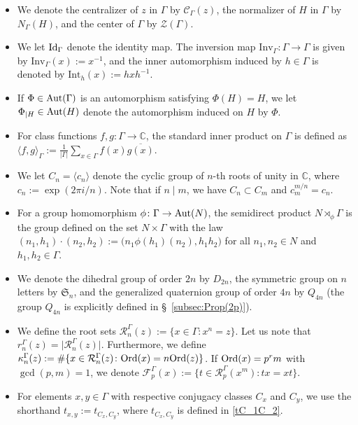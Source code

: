 \documentclass[12pt]{amsart}
\numberwithin{equation}{section}
\newcommand{\Ord}{{\rm Ord}}
\newcommand{\Id}{{\rm Id}}
\newcommand{\Aut}{{\rm Aut}}
\newcommand{\C}{\mathbb C}
\theoremstyle{definition}
\theoremstyle{remark}
\begin{document}
\begin{itemize}
    \item We denote the centralizer of $z$ in $\Gamma$ by $\mathcal{C}_\Gamma(z)$, the normalizer of $H$ in $\Gamma$ by $N_\Gamma(H)$, and the center of $\Gamma$ by $\mathcal{Z}(\Gamma)$.
    \item We let $\Id_\Gamma$ denote the identity map. The inversion map $\mathrm{Inv}_\Gamma \colon \Gamma \to \Gamma$ is given by $\mathrm{Inv}_\Gamma(x) := x^{-1}$, and the inner automorphism induced by $h \in \Gamma$ is denoted by $\mathrm{Int}_h(x) := h x h^{-1}$.
    \item If $\Phi \in \Aut(\Gamma)$ is an automorphism satisfying $\Phi(H) = H$, we let $\Phi_{|H} \in \Aut(H)$ denote the automorphism induced on $H$ by $\Phi$.
    \item For class functions $f, g \colon \Gamma \to \C$, the standard inner product on $\Gamma$ is defined as $\langle f, g \rangle_\Gamma := \frac{1}{|\Gamma|} \sum_{x \in \Gamma} f(x)\overline{g(x)}$.
    \item We let $C_n = \langle c_n \rangle$ denote the cyclic group of $n$-th roots of unity in $\C$, where $c_n := \exp(2\pi i/n)$. Note that if $n \mid m$, we have $C_n \subset C_m$ and $c_m^{m/n} = c_n$.
    \item For a group homomorphism $\phi \colon \Gamma \to \Aut(N)$, the semidirect product $N \rtimes_\phi \Gamma$ is the group defined on the set $N \times \Gamma$ with the law $(n_1, h_1) \cdot (n_2, h_2) := \bigl(n_1 \phi(h_1)(n_2), h_1 h_2\bigr)$ for all $n_1, n_2 \in N$ and $h_1, h_2 \in \Gamma$.
    \item We denote the dihedral group of order $2n$ by $D_{2n}$, the symmetric group on $n$ letters by $\mathfrak{S}_n$, and the generalized quaternion group of order $4n$ by $Q_{4n}$ (the group $Q_{4n}$ is explicitly defined in \S~\ref{subsec:Prop(2p)}).
    \item We define the root sets $\mathcal{R}_n^\Gamma(z) := \{x \in \Gamma \colon x^n = z\}$. Let us note that $r_n^\Gamma(z) = \bigl|\mathcal{R}_n^\Gamma(z)\bigr|$. Furthermore, we define $\kappa_n^\Gamma(z) := \#\{x \in \mathcal{R}_n^\Gamma(z) \colon \Ord(x) = n\Ord(z)\}$. If $\Ord(x) = p^r m$ with $\gcd(p, m) = 1$, we denote $\mathcal{F}_p^\Gamma(x) := \{t \in \mathcal{R}_p^\Gamma(x^m) \colon tx = xt\}$.
    \item For elements $x, y \in \Gamma$ with respective conjugacy classes $C_x$ and $C_y$, we use the shorthand $t_{x,y} := t_{C_x, C_y}$, where $t_{C_x,C_y}$ is defined in \eqref{tC_1C_2}.
\end{itemize}
\end{document}
